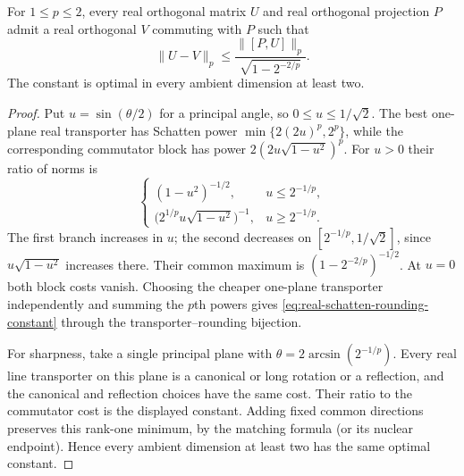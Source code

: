 \begin{corollary}
\label{cor:real-schatten-rounding-constant}
For $1\leq p\leq2$, every real orthogonal matrix $U$ and real
orthogonal projection $P$ admit a real orthogonal $V$ commuting with
$P$ such that
\begin{equation}
 \|U-V\|_p\leq
    \frac{\|[P,U]\|_p}{\sqrt{1-2^{-2/p}}}.
 \label{eq:real-schatten-rounding-constant}
\end{equation}
The constant is optimal in every ambient dimension at least two.
\end{corollary}

\begin{proof}
Put $u=\sin(\theta/2)$ for a principal angle, so
$0\leq u\leq1/\sqrt2$. The best one-plane real transporter has
Schatten power $\min\{2(2u)^p,2^p\}$, while the corresponding
commutator block has power $2(2u\sqrt{1-u^2})^p$.
For $u>0$ their ratio of norms is
\[
 \begin{cases}
  (1-u^2)^{-1/2},&u\leq2^{-1/p},\\[2pt]
  \bigl(2^{1/p}u\sqrt{1-u^2}\bigr)^{-1},&u\geq2^{-1/p}.
 \end{cases}
\]
The first branch increases in $u$; the second decreases on
$[2^{-1/p},1/\sqrt2]$, since $u\sqrt{1-u^2}$ increases there.
Their common maximum is $(1-2^{-2/p})^{-1/2}$.
At $u=0$ both block costs vanish. Choosing the cheaper one-plane
transporter independently and summing the $p$th powers gives
\cref{eq:real-schatten-rounding-constant} through the transporter--rounding
bijection.

For sharpness, take a single principal plane with
$\theta=2\arcsin(2^{-1/p})$. Every real line transporter on this
plane is a canonical or long rotation or a reflection, and the
canonical and reflection choices have the same cost. Their ratio to
the commutator cost is the displayed constant. Adding fixed common
directions preserves this rank-one minimum, by the matching formula
(or its nuclear endpoint). Hence every ambient dimension at least two
has the same optimal constant.
\end{proof}

